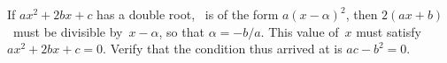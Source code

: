 If $ax^{2} + 2bx + c$ has a double root, \ie\ is of the form $a(x - \alpha)^{2}$, then
$2(ax + b)$~must be divisible by~$x - \alpha$, so that $\alpha = -b/a$. This value of~$x$ must
satisfy $ax^{2} + 2bx + c = 0$. Verify that the condition thus arrived at is
$ac - b^{2} = 0$.

